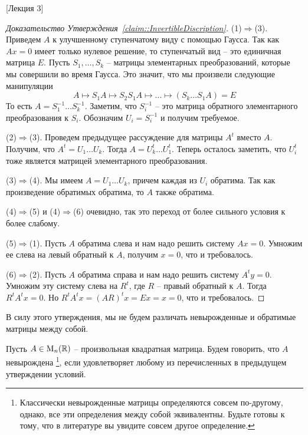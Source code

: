 [Лекция 3]


\begin{proof}
[Доказательство Утверждения~\ref{claim::InvertibleDiscription}]
(1)$\Rightarrow$(3).
Приведем $A$ к улучшенному ступенчатому виду с помощью Гаусса.
Так как $Ax = 0$ имеет только нулевое решение, то ступенчатый вид -- это единичная матрица $E$.
Пусть $S_1, \ldots, S_k$ -- матрицы элементарных преобразований, которые мы совершили во время Гаусса.
Это значит, что мы произвели следующие манипуляции
\[
A \mapsto S_1 A \mapsto S_2 S_1 A \mapsto \ldots \mapsto (S_k \ldots S_1 A) = E
\]
То есть $A = S_1^{-1}\ldots S_k^{-1}$.
Заметим, что $S_i^{-1}$ -- это матрица обратного элементарного преобразования к $S_i$.
Обозначим $U_i = S_i^{-1}$ и получим требуемое.

(2)$\Rightarrow$(3).
Проведем предыдущее рассуждение для матрицы $A^t$ вместо $A$.
Получим, что $A^t = U_1\ldots U_k$.
Тогда $A = U_k^t \ldots U_1^t$.
Теперь осталось заметить, что $U_i^t$ тоже является матрицей элементарного преобразования.

(3)$\Rightarrow$(4).
Мы имеем $A=U_1\ldots U_k$, причем каждая из $U_i$ обратима.
Так как произведение обратимых обратима, то $A$ также обратима.

(4)$\Rightarrow$(5) и (4)$\Rightarrow$(6) очевидно, так это переход от более сильного условия к более слабому.

(5)$\Rightarrow$(1).
Пусть $A$ обратима слева и нам надо решить систему $Ax = 0$.
Умножим ее слева на левый обратный к $A$, получим $x = 0$, что и требовалось.

(6)$\Rightarrow$(2).
Пусть $A$ обратима справа и нам надо решить систему $A^ty = 0$.
Умножим эту систему слева на $R^t$, где $R$ -- правый обратный к $A$.
Тогда $R^t A^t x = 0$.
Но $R^t A^t x = (AR)^tx = Ex = x = 0$, что и требовалось.
\end{proof}

В силу этого утверждения, мы не будем различать невырожденные и обратимые матрицы между собой.

\begin{definition}
Пусть $A\in\operatorname{M}_{n}(\mathbb R)$ -- произвольная квадратная матрица.
Будем говорить, что $A$ невырождена%
\footnote{Классически невырожденные матрицы определяются совсем по-другому, однако, все эти определения между собой эквивалентны.
Будьте готовы к тому, что в литературе вы увидите совсем другое определение.},
если удовлетворяет любому из перечисленных в предыдущем утверждении условий.
\end{definition}


